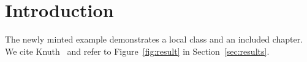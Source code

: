 \section{Introduction}
The newly minted example demonstrates a local class and an included chapter.
We cite Knuth~\cite{knuth1984} and refer to Figure~\ref{fig:result} in Section~\ref{sec:results}.
